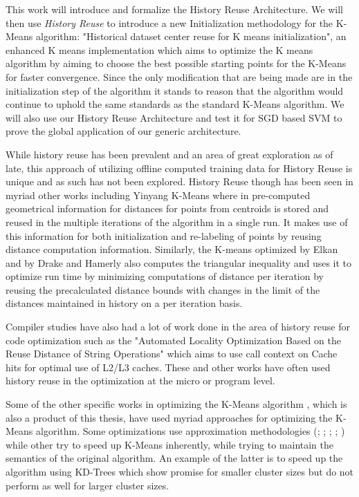 This work will introduce and formalize the History Reuse Architecture. We will then use \textit{History Reuse} to introduce a new Initialization methodology for the K-Means algorithm: "Historical dataset center reuse for K means initialization", an enhanced K means implementation which aims to optimize the K means algorithm by aiming to choose the best possible starting points for the K-Means\cite{kmeans_orig} for faster convergence. Since the only modification that are being made are in the initialization step of the algorithm it stands to reason that the algorithm would continue to uphold the same standards as the standard K-Means algorithm. We will also use our History Reuse Architecture and test it for SGD based SVM\cite{sgd_svm} to prove the global application of our generic architecture.

While history reuse has been prevalent and an area of great exploration as of late, this approach of utilizing offline computed training data for History Reuse is unique and as such has not been explored. History Reuse though has been seen in myriad other works including Yinyang K-Means \cite{yinyang_kmeans} where in pre-computed geometrical information for distances for points from centroids is stored and reused in the multiple iterations of the algorithm in a single run. It makes use of this information for both initialization and re-labeling of points by reusing distance computation information. Similarly, the K-means optimized by Elkan \cite{Elkan03usingthe} and by Drake and Hamerly\cite{drake} also computes the triangular inequality and uses it to optimize run time by minimizing computations of distance per iteration by reusing the precalculated distance bounds with changes in the limit of the distances maintained in history on a per iteration basis.

Compiler studies have also had a lot of work done in the area of history reuse for code optimization such as the "Automated Locality Optimization Based on the Reuse Distance of String Operations" \cite{auto_cache_opt} which aims to use call context on Cache hits for optimal use of L2/L3 caches. These and other works\cite{value_reuse_extended}\cite{load_reuse_proceeding}\cite{load_reuse_proceeding_article}\cite{locality_block_reuse} have often used history reuse in the optimization at the micro or program level. 

Some of the other specific works in optimizing the K-Means algorithm \cite{kmeans_orig}, which is also a product of this thesis, have used myriad approaches for optimizing the K-Means algorithm. Some optimizations use approximation methodologies (\cite{Czumaj}; \cite{Sculley}; \cite{4270197}; \cite{Guha:1998:CEC:276305.276312}; \cite{Zeng:2012:FAK:2354409.2354758}) while other try to speed up K-Means inherently, while trying to maintain the semantics of the original algorithm. An example of the latter is to speed up the algorithm using KD-Trees \cite{Pelleg:1999:AEK:312129.312248}\cite{Kanungo:2002:EKC:628329.628801} which show promise for smaller cluster sizes but do not perform as well for larger cluster sizes.

